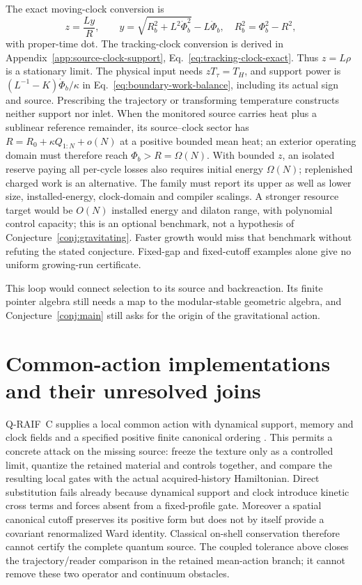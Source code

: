 The exact moving-clock conversion is
\begin{equation}\label{eq:loop-moving-clock}
 z=\frac{Ly}{R},\qquad
 y=\sqrt{R_b^2+L^2\dot\Phi_b^2}-L\dot\Phi_b,
 \quad R_b^2=\Phi_b^2-R^2,
\end{equation}
with proper-time dot. The tracking-clock conversion is derived in
Appendix~\ref{app:source-clock-support}, Eq.~\eqref{eq:tracking-clock-exact}.
Thus $z=L\rho$ is a stationary limit. The physical input needs
$zT_\tau=T_H$, and support power is
$(L^{-1}-K)\dot\Phi_b/\kappa$ in
Eq.~\eqref{eq:boundary-work-balance}, including its actual sign and source.
Prescribing the trajectory or transforming temperature constructs
neither support nor inlet. When the monitored source carries heat plus
a sublinear reference remainder, its source--clock sector has
$R=R_0+\kappa Q_{1:N}+o(N)$ at a positive bounded mean heat; an exterior
operating domain must therefore reach $\Phi_b>R=\Omega(N)$.
With bounded $z$, an isolated reserve paying all per-cycle losses also
requires initial energy $\Omega(N)$; replenished charged work is an
alternative. The family must report its upper as well as lower size, installed-energy,
clock-domain and compiler scalings. A stronger resource target would be
$O(N)$ installed energy and dilaton range, with polynomial control
capacity; this is an optional benchmark, not a hypothesis of
Conjecture~\ref{conj:gravitating}. Faster growth would miss that benchmark
without refuting the stated conjecture. Fixed-gap and fixed-cutoff
examples alone give no uniform growing-run certificate.

This loop would connect selection to its source and backreaction.
Its finite pointer algebra still needs a map to the modular-stable
geometric algebra, and Conjecture~\ref{conj:main} still asks for the
origin of the gravitational action.



\section{Common-action implementations and their unresolved joins}
\label{app:common-action-implementations}

Q-RAIF~C supplies a local common action with dynamical support, memory
and clock fields and a specified positive finite canonical ordering
\cite{QRC}. This permits a concrete attack on the missing source:
freeze the texture only as a controlled limit, quantize the retained
material and controls together, and compare the resulting local gates
with the actual acquired-history Hamiltonian. Direct substitution fails
already because dynamical support and clock introduce kinetic cross
terms and forces absent from a fixed-profile gate. Moreover a spatial
canonical cutoff preserves its positive form but does not by itself
provide a covariant renormalized Ward identity. Classical on-shell
conservation therefore cannot certify the complete quantum source.
The coupled tolerance above closes the trajectory/reader comparison in
the retained mean-action branch; it cannot remove these two operator
and continuum obstacles.

